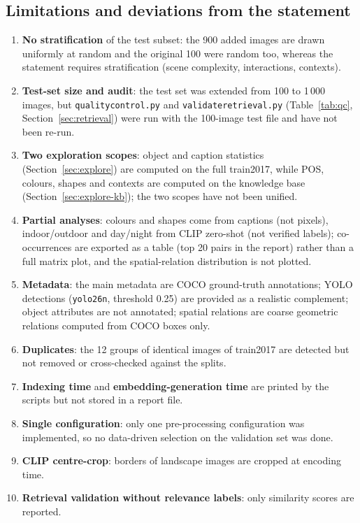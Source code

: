 \documentclass[11pt,a4paper]{article}
\renewcommand{\_}{\textunderscore\allowbreak{}}
\newcommand{\code}[1]{\texttt{#1}}
\begin{document}
\subsection{Limitations and deviations from the statement}
\begin{enumerate}[nosep]

  \item \textbf{No stratification} of the test subset: the 900 added images are drawn uniformly at random and the original 100 were random too, whereas the statement requires stratification (scene complexity, interactions, contexts).
  \item \textbf{Test-set size and audit}: the test set was extended from 100 to 1\,000 images, but \code{quality\_control.py} and \code{validate\_retrieval.py} (Table~\ref{tab:qc}, Section~\ref{sec:retrieval}) were run with the 100-image test file and have not been re-run.
  \item \textbf{Two exploration scopes}: object and caption statistics (Section~\ref{sec:explore}) are computed on the full train2017, while POS, colours, shapes and contexts are computed on the knowledge base (Section~\ref{sec:explore-kb}); the two scopes have not been unified.
  \item \textbf{Partial analyses}: colours and shapes come from captions (not pixels), indoor/outdoor and day/night from CLIP zero-shot (not verified labels); co-occurrences are exported as a table (top 20 pairs in the report) rather than a full matrix plot, and the spatial-relation distribution is not plotted.
  \item \textbf{Metadata}: the main metadata are COCO ground-truth annotations; YOLO detections (\code{yolo26n}, threshold 0.25) are provided as a realistic complement; object attributes are not annotated; spatial relations are coarse geometric relations computed from COCO boxes only.
  \item \textbf{Duplicates}: the 12 groups of identical images of train2017 are detected but not removed or cross-checked against the splits.
  \item \textbf{Indexing time} and \textbf{embedding-generation time} are printed by the scripts but not stored in a report file.
  \item \textbf{Single configuration}: only one pre-processing configuration was implemented, so no data-driven selection on the validation set was done.
  \item \textbf{CLIP centre-crop}: borders of landscape images are cropped at encoding time.
  \item \textbf{Retrieval validation without relevance labels}: only similarity scores are reported.
\end{enumerate}
\end{document}
